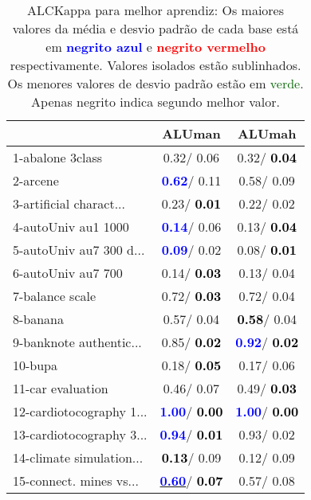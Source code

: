 \begin{table}[h]
\caption{ALCKappa para melhor aprendiz: Os maiores valores da média e desvio padrão de cada base está em \textcolor{blue}{\textbf{negrito azul}} e \textcolor{red}{\textbf{negrito vermelho}} respectivamente. Valores isolados estão sublinhados. Os menores valores de desvio padrão estão em \textcolor{darkgreen}{verde}. Apenas negrito indica segundo melhor valor.}
\begin{center}\begin{tabular}{lc|c}
 & ALUman & ALUmah\\ \hline 1-abalone 3class &   0.32/  0.06 &   0.32/\textcolor{black}{\textbf{  0.04}} \\
2-arcene & \textcolor{blue}{\textbf{  0.62}}/  0.11 &   0.58/  0.09 \\
3-artificial charact... &   0.23/\textcolor{black}{\textbf{  0.01}} &   0.22/  0.02 \\
4-autoUniv au1 1000 & \textcolor{blue}{\textbf{  0.14}}/  0.06 &   0.13/\textcolor{black}{\textbf{  0.04}} \\
5-autoUniv au7 300 d... & \textcolor{blue}{\textbf{  0.09}}/  0.02 &   0.08/\textcolor{black}{\textbf{  0.01}} \\
6-autoUniv au7 700 &   0.14/\textcolor{black}{\textbf{  0.03}} &   0.13/  0.04 \\
7-balance scale &   0.72/\textcolor{black}{\textbf{  0.03}} &   0.72/  0.04 \\ \hline
8-banana &   0.57/  0.04 & \textcolor{black}{\textbf{  0.58}}/  0.04 \\
9-banknote authentic... &   0.85/\textcolor{black}{\textbf{  0.02}} & \textcolor{blue}{\textbf{  0.92}}/\textcolor{black}{\textbf{  0.02}} \\
10-bupa &   0.18/\textcolor{black}{\textbf{  0.05}} &   0.17/  0.06 \\
11-car evaluation &   0.46/  0.07 &   0.49/\textcolor{black}{\textbf{  0.03}} \\
12-cardiotocography 1... & \textcolor{blue}{\textbf{  1.00}}/\textcolor{black}{\textbf{  0.00}} & \textcolor{blue}{\textbf{  1.00}}/\textcolor{black}{\textbf{  0.00}} \\
13-cardiotocography 3... & \textcolor{blue}{\textbf{  0.94}}/\textcolor{black}{\textbf{  0.01}} &   0.93/  0.02 \\
14-climate simulation... & \textcolor{black}{\textbf{  0.13}}/  0.09 &   0.12/  0.09 \\ \hline
15-connect. mines vs... & \underline{\textcolor{blue}{\textbf{  0.60}}}/\textcolor{black}{\textbf{  0.07}} &   0.57/  0.08 \\

\end{tabular}
\end{center}
\end{table}
